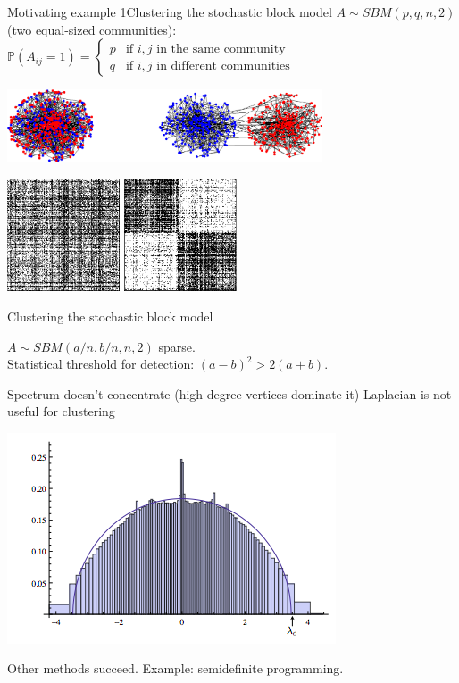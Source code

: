 \documentclass{beamer}
\begin{document}
\begin{frame}{Motivating example 1}{Clustering the stochastic block model}
$A\sim SBM(p, q, n, 2)$
 (two equal-sized communities): $\mathbb P(A_{ij}=1)=\left\{ \begin{matrix} p & \text{if $i,j$ in the same community} \\ q &  \text{if $i,j$ in different communities}\end{matrix} \right.$
\begin{center}
\includegraphics[width=0.7\textwidth]{figs/sbm2}
\pause
\vfill

\includegraphics[width=0.25\textwidth]{figs/disorder}
\hspace{30pt}
\includegraphics[width=0.25\textwidth]{figs/order}
\end{center}
\end{frame}


\begin{frame}{Clustering the stochastic block model}

$A\sim SBM(a/n, b/n, n, 2)$ sparse. \\
Statistical threshold for detection: $(a-b)^2>2(a+b)$.

\bigskip
Spectrum doesn't concentrate (high degree vertices dominate it)
Laplacian is not useful for clustering
\begin{center}
\includegraphics[height=.25\textwidth]{figs/spectral}
\end{center}

Other methods succeed. Example: semidefinite programming.
\let\thefootnote\relax{}
\let\thefootnote\relax{}
\let\thefootnote\relax{}

\end{frame}
\end{document}
